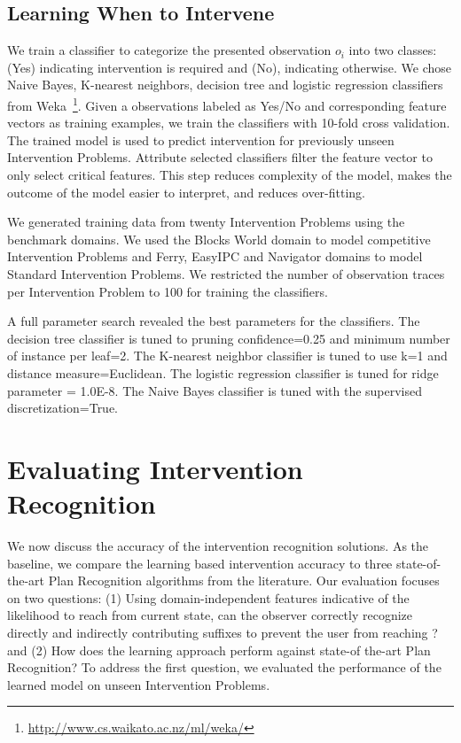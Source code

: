 \subsection{Learning When to Intervene}
\label{sec:learning-to-intervene}
We train a classifier to categorize the presented observation $o_i$ into two classes: (Yes) indicating intervention is required and (No), indicating otherwise. 
We chose Naive Bayes, K-nearest neighbors, decision tree and logistic regression classifiers from Weka~\footnote{\url{http://www.cs.waikato.ac.nz/ml/weka/}}. 
Given a observations labeled as Yes/No and corresponding feature vectors as training examples, we train the classifiers with 10-fold cross validation. 
The trained model is used to predict intervention for previously unseen Intervention Problems. 
Attribute selected classifiers filter the feature vector to only select critical features. 
This step reduces complexity of the model, makes the outcome of the model easier to interpret, and reduces over-fitting. 

We generated training data from twenty Intervention Problems using the benchmark domains. We used the Blocks World domain to model competitive Intervention Problems and Ferry, EasyIPC and Navigator domains to model Standard Intervention Problems.
We restricted the number of observation traces per Intervention Problem to 100 for training the classifiers.
 
A full parameter search revealed the best parameters for the classifiers. 
The decision tree classifier is tuned to pruning confidence=0.25 and minimum number of instance per leaf=2. 
The K-nearest neighbor classifier is tuned to use k=1 and distance measure=Euclidean. 
The logistic regression classifier is tuned for ridge parameter = 1.0E-8. 
The Naive Bayes classifier is tuned with the supervised discretization=True.
%
\section{Evaluating Intervention Recognition}
\label{sec:evaluating-intervention}
We now discuss the accuracy of the intervention recognition solutions.
As the baseline, we compare the learning based intervention accuracy to three state-of-the-art Plan Recognition algorithms from the literature. 
Our evaluation focuses on two questions: (1) Using domain-independent features indicative of the likelihood to reach \undesired from current state, can the observer correctly recognize directly and indirectly contributing suffixes to prevent the user from reaching \undesired? and (2) How does the learning approach perform against state-of the-art Plan Recognition? 
To address the first question, we evaluated the performance of the learned model on unseen Intervention Problems.

